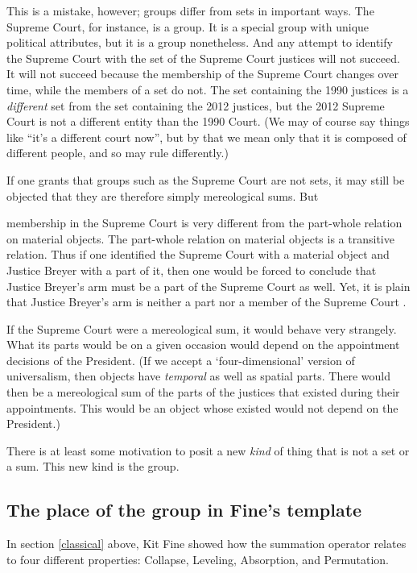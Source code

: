 \documentclass[11pt]{article}
\newenvironment{squote}{%
\begin{spacing}{1}
       	\begin{list}{}{%
\setlength{\labelwidth}{0pt}%
\rightmargin\leftmargin%
}
\item\relax
}{%
\end{list}%
\end{spacing}
}
\begin{document}
\begin{spacing}{1.25}
This is a mistake, however; groups differ from sets in important ways.
The Supreme Court, for instance, is a group.  It is a special group
with unique political attributes, but it is a group nonetheless.  And
any attempt to identify the Supreme Court with the set of the Supreme
Court justices will not succeed.  It will not succeed because the
membership of the Supreme Court changes over time, while the members
of a set do not.  The set containing the 1990 justices is a {\em
  different} set from the set containing the 2012 justices, but the
2012 Supreme Court is not a different entity than the 1990 Court.  (We
may of course say things like ``it's a different court now'', but by
that we mean only that it is composed of different people, and so may
rule differently.)

If one grants that groups such as the Supreme Court are not sets, it
may still be objected that they are therefore simply mereological
sums.  But 

\begin{squote}
membership in the Supreme Court is very different from
the part-whole relation on material objects.  The part-whole relation
on material objects is a transitive relation.  Thus if one identified
the Supreme Court with a material object and Justice Breyer with a
part of it, then one would be forced to conclude that Justice Breyer's
arm must be a part of the Supreme Court as well.  Yet, it is plain
that Justice Breyer's arm is neither a part nor a member of the
Supreme Court \citep[136--137]{uzquiano2004a}.
\end{squote}

If the Supreme Court were a mereological sum, it would behave very
strangely.  What its parts would be on a given occasion would depend
on the appointment decisions of the President.  (If we accept a
`four-dimensional' version of universalism, then objects have {\em
  temporal} as well as spatial parts.  There would then be a
mereological sum of the parts of the justices that existed during
their appointments.  This would be an object whose existed would not
depend on the President.)

There is at least some motivation to posit a new {\em kind} of thing
that is not a set or a sum.  This new kind is the group.

\subsection{The place of the group in Fine's template}
\label{group-temp}
In section \ref{classical} above, Kit Fine showed how the summation
operator relates to four different properties: Collapse, Leveling,
Absorption, and Permutation.


\end{spacing}
\end{document}

